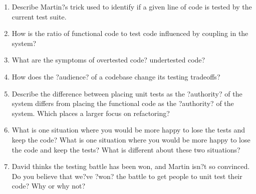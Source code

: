 \begin{enumerate}
\begin{enumerate}

			\item Describe Martin?s trick used to identify if a given line of code is tested by the current test suite.


			\item How is the ratio of functional code to test code influenced by coupling in the system?


			\item What are the symptoms of overtested code? undertested code?


			\item How does the ?audience? of a codebase change its testing tradeoffs?


			\item Describe the difference between placing unit tests as the ?authority? of the system differs from placing the functional code as the ?authority? of the system. Which places a larger focus on refactoring?


			\item What is one situation where you would be more happy to lose the tests and keep the code? What is one situation where you would be more happy to lose the code and keep the tests? What is different about these two situations?


			\item David thinks the testing battle has been won, and Martin isn?t so convinced. Do you believe that we?ve ?won? the battle to get people to unit test their code? Why or why not?


		\end{enumerate}

\end{enumerate}



